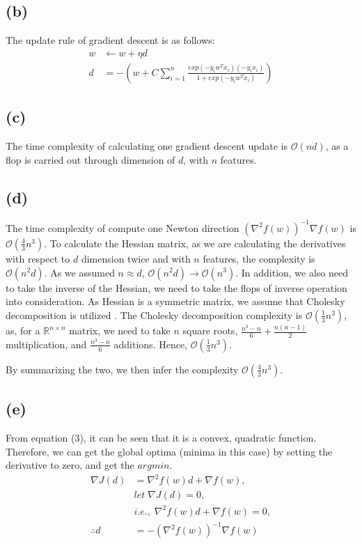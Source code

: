\documentclass[a4paper,12pt]{article}
\begin{document}
\subsection*{(b)}
\noindent The update rule of gradient descent is as follows:
\begin{align*}
   w &\leftarrow w + \eta d \\
   d &= -(w + C \sum_{i=1}^{n} \frac{ exp(-y_i w^T x_i)(-y_i x_i)}{1+exp(-y_i w^T x_i)})
\end{align*}

\subsection*{(c)}
\noindent The time complexity of calculating one gradient descent update is $\mathcal{O}(nd)$,
as a flop is carried out through dimension of $d$, with $n$ features.

\subsection*{(d)}
\noindent The time complexity of compute one Newton direction 
$(\nabla^2 f(w))^{-1} \nabla f(w)$ is $\mathcal{O}(\frac{4}{3}n^3)$.
To calculate the Hessian matrix, as we are calculating the derivatives with respect to $d$ dimension
twice and with $n$ features, the complexity is $\mathcal{O}(n^2 d)$. As we assumed $n \approx d$,
$\mathcal{O}(n^2 d) \rightarrow \mathcal{O}(n^3)$. In addition, we also need to take the inverse
of the Hessian, we need to take the flops of inverse operation into consideration.
As Hessian is a symmetric matrix, we assume that Cholesky decomposition is utilized \cite[p. 510]{boyd2004convex}.
The Cholesky decomposition complexity is $\mathcal{O}(\frac{1}{3}n^3)$, as,
for a $\mathbb{R}^{n \times n}$ matrix, we need to take $n$ square roots, 
$\frac{n^3 - n}{6} + \frac{n(n-1)}{2}$ multiplication, and $\frac{n^3 - n}{6}$ additions.
Hence, $\mathcal{O}(\frac{1}{3}n^3)$.

By summarizing the two, we then infer the complexity $\mathcal{O}(\frac{4}{3}n^3)$.

\subsection*{(e)}
From equation (3), it can be seen that it is a convex, quadratic function. Therefore, 
we can get the global optima (minima in this case) by setting the derivative to zero, and get the $argmin$.
\begin{align*}
   \nabla J(d) &= \nabla^2 f(w) d + \nabla f(w), \\
   &let \; \nabla J(d) = 0,\\
   &i.e., \; \nabla^2 f(w) d + \nabla f(w) = 0,\\
   \therefore d &= -(\nabla^2 f(w))^{-1}\nabla f(w)
\end{align*}
\end{document}
